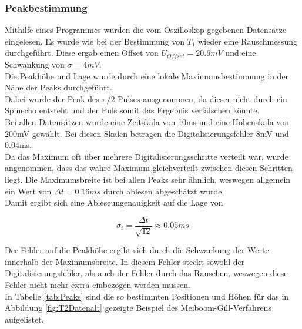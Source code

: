 \documentclass[12pt,a4paper]{article}
\begin{document}
\subsubsection{Peakbestimmung}
Mithilfe eines Programmes wurden die vom Oszilloskop gegebenen Datensätze eingelesen.
Es wurde wie bei der Bestimmung von $T_1$ wieder eine Rauschmessung durchgeführt.
Diese ergab einen Offset von $U_{Offset} = 20.6mV$ und eine Schwankung von $\sigma = 4mV$.\\
Die Peakhöhe und Lage wurde durch eine lokale Maximumsbestimmung in der Nähe der Peaks durchgeführt.\\
Dabei wurde der Peak des $\pi/2$ Pulses ausgenommen, da dieser nicht durch ein Spinecho entsteht und der Puls somit das Ergebnis verfälschen könnte.\\
Bei allen Datensätzen wurde eine Zeitskala von 10ms und eine Höhenskala von 200mV gewählt. Bei diesen Skalen betragen die Digitalisierungsfehler 8mV und 0.04ms.\\
Da das Maximum oft über mehrere Digitalisierungsschritte verteilt war, wurde angenommen, dass das wahre Maximum gleichverteilt zwischen diesen Schritten liegt. Die Maximumsbreite ist bei allen Peaks sehr ähnlich, weswegen allgemein ein Wert von $\Delta t = 0.16ms$ durch ablesen abgeschätzt wurde.\\
Damit ergibt sich eine Ableseungenauigkeit auf die Lage von

\begin{equation*}
\sigma_t = \dfrac{\Delta t}{\sqrt{12}} \approx 0.05ms
\end{equation*}

Der Fehler auf die Peakhöhe ergibt sich durch die Schwankung der Werte innerhalb der Maximumsbreite. In diesem Fehler steckt sowohl der Digitalisierungsfehler, als auch der Fehler durch das Rauschen, weswegen diese Fehler nicht mehr extra einbezogen werden müssen.\\
In Tabelle \ref{tab:Peaks} sind die so bestimmten Positionen und Höhen für das in Abbildung \ref{fig:T2Datenalt} gezeigte Beispiel des Meiboom-Gill-Verfahrens aufgelistet.
\end{document}

